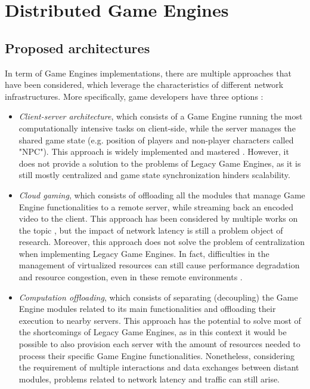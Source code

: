 \section{Distributed Game Engines}

\subsection{Proposed architectures}
In term of Game Engines implementations, there are multiple approaches that have been considered, which leverage the characteristics of different network infrastructures. More specifically, game developers have three options \cite{womak:performance-analysis-game-engine}:
\begin{itemize}
	\item \textit{Client-server architecture}, which consists of a Game Engine running the most computationally intensive tasks on client-side, while the server manages the shared game state (e.g. position of players and non-player characters called "NPC"). This approach is widely implemented and mastered \cite{womak:performance-analysis-game-engine}. However, it does not provide a solution to the problems of Legacy Game Engines, as it is still mostly centralized and game state synchronization hinders scalability.
	\item \textit{Cloud gaming}, which consists of offloading all the modules that manage Game Engine functionalities to a remote server, while streaming back an encoded video to the client. This approach has been considered by multiple works on the topic \cite{womak:revamping-cloud-games, womak:distributed-cloud-gaming-pipeline}, but the impact of network latency is still a problem object of research. Moreover, this approach does not solve the problem of centralization when implementing Legacy Game Engines. In fact, difficulties in the management of virtualized resources  can still cause performance degradation and resource congestion, even in these remote environments \cite{womak:performance-analysis-game-engine}.
	\item \textit{Computation offloading}, which consists of separating (decoupling) the Game Engine modules related to its main functionalities and offloading their execution to nearby servers. This approach has the potential to solve most of the shortcomings of Legacy Game Engines, as in this context it would be possible to also provision each server with the amount of resources needed to process their specific Game Engine functionalities. Nonetheless, considering the requirement of multiple interactions and data exchanges between distant modules, problems related to network latency and traffic can still arise.
\end{itemize}
